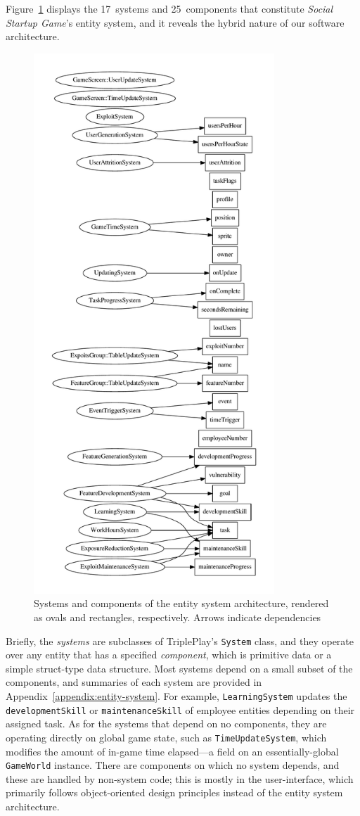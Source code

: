\documentclass[letterpaper]{article}
\begin{document}
Figure~\ref{fig:sys-dep} displays the 17~systems and 25~components
that constitute \textit{Social Startup Game}'s entity system, and it
reveals the hybrid nature of our software architecture.
%
\begin{figure}
\centering
\includegraphics[height=8in]{sys-dep.pdf}
\caption{Systems and components of the entity system architecture, rendered as ovals and rectangles, respectively. Arrows indicate dependencies}
\label{fig:sys-dep}
\end{figure}
%
Briefly, the
\textit{systems} are subclasses of TriplePlay's \texttt{System} class,
and they operate over any entity that has a specified
\textit{component}, which is primitive data or a simple struct-type
data structure.  Most systems depend on a small subset of the components,
and summaries of each system are provided in
Appendix~\ref{appendix:entity-system}.  
For example, \texttt{LearningSystem} updates the
\texttt{developmentSkill} or \texttt{maintenanceSkill} of employee
entities depending on their assigned task.
As for the systems that
depend on no components, they are operating directly on global game
state, such as \texttt{TimeUpdateSystem}, which modifies the amount of
in-game time elapsed---a field on an essentially-global
\texttt{GameWorld} instance.
There are components on which no system depends, and these are handled
by non-system code; this is mostly in the user-interface, which primarily
follows object-oriented design principles instead of the entity
system architecture.
\end{document}

